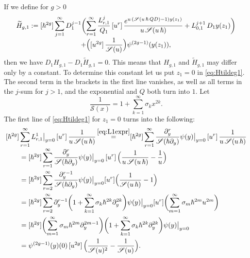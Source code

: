 \documentclass[11pt]{article}
\let\mathcal\mathscr
\theoremstyle{plain}
\theoremstyle{definition}
\theoremstyle{remark}
\newcommand{\cS}{\mathcal{S}}
\begin{document}
If we define for $g>0$\vspace*{-5pt}
\begin{multline}\label{eq:Htildeg1}
\widetilde H_{g,1} :=[\hbar^{2g}]\sum_{j=1}^\infty D_1^{j-1} \biggl(\sum_{r=1}^\infty\frac{L_{r,1}^j}{Q_1}
\,[u^r]\, \frac{e^{u\,(\cS(u\,\hbar\,Q D)-1)y(z_1)}}{u\,\cS(u\,\hbar)}+L_{0,1}^{j+1}\, D_1y(z_1) \biggr)
\\[-3pt]
+\Bigl([u^{2g}]\,\frac1{\cS(u)}\Bigr) \psi^{(2g-1)}(y(z_1)),
\end{multline}
then we have $D_1H_{g,1}-D_1\widetilde H_{g,1}=0$. This means that $H_{g,1}$ and $\widetilde H_{g,1}$ may differ only by a constant. To determine this constant let us put $z_1=0$ in \eqref{eq:Htildeg1}. The second term in the brackets in the first line vanishes, as well as all terms in the $j$-sum for $j>1$, and the exponential and $Q$ both turn into $1$.
Let\vspace*{-5pt}
\begin{equation*}
\dfrac{1}{\cS(x)}=1+\sum_{k=1}^\infty \sigma_k x^{2k}.
\end{equation*}
The first line of \eqref{eq:Htildeg1} for $z_1=0$ turns into the following:\vspace*{-5pt}
\begin{align*}
&[\hbar^{2g}]\sum_{r=1}^\infty L_{r,1}^1\big|_{y=0}
\,[u^r]\, \frac{1}{u\,\cS(u\,\hbar)}\mathop{=}^{\eqref{eq:L1expr}}[\hbar^{2g}]\sum_{r=1}^\infty \frac{\partial_{y}^r}{\cS(\hbar \partial_{y})}\psi(y)\big|_{y=0} \,[u^r]\, \frac{1}{u\,\cS(u\,\hbar)} \\[-3pt]
&\qquad =[\hbar^{2g}]\sum_{r=1}^\infty \frac{\partial_{y}^r}{\cS(\hbar \partial_{y})}\psi(y)\big|_{y=0} \,[u^r]\, \Bigl(\frac{1}{u\,\cS(u\,\hbar)}-\dfrac{1}{u} \Bigr)\\
&\qquad =[\hbar^{2g}]\sum_{r=2}^\infty \frac{\partial_{y}^{r-1}}{\cS(\hbar \partial_{y})}\psi(y)\big|_{y=0} [u^{r}] \Bigl(\frac{1}{\cS(u\,\hbar)}-1 \Bigr)\\
&\qquad =[\hbar^{2g}]\sum_{r=2}^\infty \partial_{y}^{r-1}\biggl(1+\sum_{k=1}^\infty \sigma_k \hbar^{2k}\partial_y^{2k} \biggr)\psi(y)\big|_{y=0} [u^{r}] \biggl(\sum_{m=1}^\infty \sigma_m \hbar^{2m}u^{2m} \biggr)\\
&\qquad =[\hbar^{2g}] \biggl(\sum_{m=1}^\infty \sigma_m \hbar^{2m}\partial_y^{2m-1} \biggr) \biggl(1+\sum_{k=1}^\infty \sigma_k \hbar^{2k}\partial_y^{2k} \biggr)\psi(y)\big|_{y=0}\\
&\qquad =\psi^{(2g-1)}(y)(0)\,[u^{2g}]\,\Bigl(\dfrac{1}{\cS(u)^2}-\dfrac{1}{\cS(u)}\Bigr).
\end{align*}
\end{document}
